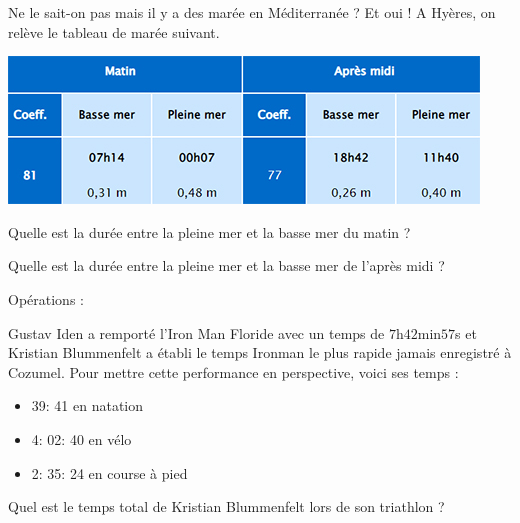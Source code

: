 \begin{pageParcourst}


Ne le sait-on pas mais il y a des marée en Méditerranée ? Et oui ! A Hyères, on relève le tableau de marée suivant.

 \begin{minipage}{10cm}
\includegraphics[scale=0.7]{FIG/grandeurs_mesures/maree.jpg} 

Quelle est la durée entre la pleine mer et la basse mer du matin ? 

Quelle est la durée entre la pleine mer et la basse mer de l'après midi ? 


 \end{minipage}
\begin{minipage}{5cm}
  Opérations :
  \vspace{6cm}
\end{minipage}



 

Gustav Iden a remporté l’Iron Man Floride avec un temps de $7$h$42$min$57$s et Kristian Blummenfelt a établi le temps Ironman le plus rapide jamais enregistré à Cozumel. Pour mettre cette performance en perspective, voici ses temps :

\begin{itemize}
\item 39: 41 en natation
\item 4: 02: 40 en vélo
\item 2:  35: 24 en course à pied
\end{itemize}

Quel est le temps total de Kristian Blummenfelt lors de son triathlon ?



\begin{enumerate}
 

\end{enumerate}
\end{pageParcourst}
